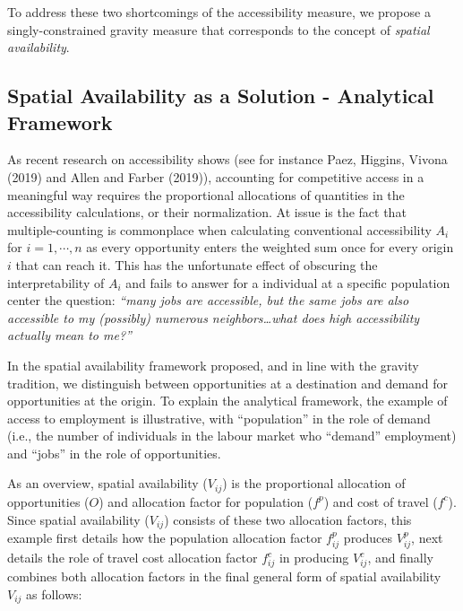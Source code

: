 \documentclass[]{elsarticle} %
\begin{document}
To address these two shortcomings of the accessibility measure, we
propose a singly-constrained gravity measure that corresponds to the
concept of \emph{spatial availability}.

\hypertarget{spatial-availability-as-a-solution---analytical-framework}{%
\subsection{Spatial Availability as a Solution - Analytical
Framework}\label{spatial-availability-as-a-solution---analytical-framework}}

As recent research on accessibility shows (see for instance Paez,
Higgins, Vivona (2019) and Allen and Farber (2019)), accounting for
competitive access in a meaningful way requires the proportional
allocations of quantities in the accessibility calculations, or their
normalization. At issue is the fact that multiple-counting is
commonplace when calculating conventional accessibility \(A_i\) for
\(i=1,\cdots,n\) as every opportunity enters the weighted sum once for
every origin \(i\) that can reach it. This has the unfortunate effect of
obscuring the interpretability of \(A_i\) and fails to answer for a
individual at a specific population center the question: \emph{``many
jobs are accessible, but the same jobs are also accessible to my
(possibly) numerous neighbors\ldots what does high accessibility
actually mean to me?''}

In the spatial availability framework proposed, and in line with the
gravity tradition, we distinguish between opportunities at a destination
and demand for opportunities at the origin. To explain the analytical
framework, the example of access to employment is illustrative, with
``population'' in the role of demand (i.e., the number of individuals in
the labour market who ``demand'' employment) and ``jobs'' in the role of
opportunities.

As an overview, spatial availability (\(V_{ij}\)) is the proportional
allocation of opportunities (\(O\)) and allocation factor for population
(\(f^p\)) and cost of travel (\(f^c\)). Since spatial availability
(\(V_{ij}\)) consists of these two allocation factors, this example
first details how the population allocation factor \(f^p_{ij}\) produces
\(V^p_{ij}\), next details the role of travel cost allocation factor
\(f^c_{ij}\) in producing \(V^c_{ij}\), and finally combines both
allocation factors in the final general form of spatial availability
\(V_{ij}\) as follows:
\end{document}
